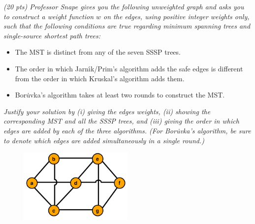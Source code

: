 \documentclass[12pt]{article} \setlength{\oddsidemargin}{0in}
\begin{document}
\textit{(20 pts) Professor Snape gives you the following unweighted graph and asks you to
construct a weight function $w$ on the edges, using positive integer weights only, such
that the following conditions are true regarding minimum spanning trees and single-source shortest path trees:}
\begin{itemize}
\item The MST is distinct from any of the seven SSSP trees.
\item The order in which Jarnı́k/Prim’s algorithm adds the safe edges is different from the order in which Kruskal’s algorithm adds them.
\item Boru̇vka’s algorithm takes at least two rounds to construct the MST.
\end{itemize}

\textit{Justify your solution by (i) giving the edges weights, (ii) showing the corresponding
MST and all the SSSP trees, and (iii) giving the order in which edges are added by
each of the three algorithms. (For Boru̇vka’s algorithm, be sure to denote which edges
are added simultaneously in a single round.)}

\begin{figure}[h]
  \centering \includegraphics[width=0.5\textwidth]{P2}
\end{figure}

\newpage
\end{document}
